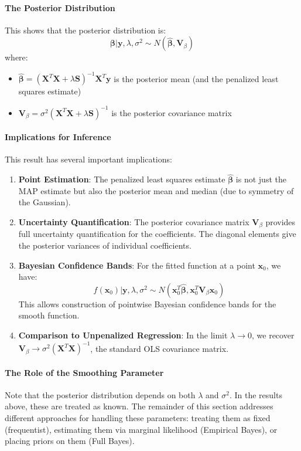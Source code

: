 \documentclass[11pt, a4paper]{article}
\begin{document}
\paragraph{The Posterior Distribution}
This shows that the posterior distribution is:
\[ \boxed{\boldsymbol{\beta} | \mathbf{y}, \lambda, \sigma^2 \sim N(\hat{\boldsymbol{\beta}}, \mathbf{V}_{\beta})} \]
where:
\begin{itemize}
\item $\hat{\boldsymbol{\beta}} = (\mathbf{X}^T\mathbf{X} + \lambda\mathbf{S})^{-1}\mathbf{X}^T\mathbf{y}$ is the posterior mean (and the penalized least squares estimate)
\item $\mathbf{V}_{\beta} = \sigma^2(\mathbf{X}^T\mathbf{X} + \lambda\mathbf{S})^{-1}$ is the posterior covariance matrix
\end{itemize}

\paragraph{Implications for Inference}
This result has several important implications:

\begin{enumerate}
\item \textbf{Point Estimation}: The penalized least squares estimate $\hat{\boldsymbol{\beta}}$ is not just the MAP estimate but also the posterior mean and median (due to symmetry of the Gaussian).

\item \textbf{Uncertainty Quantification}: The posterior covariance matrix $\mathbf{V}_{\beta}$ provides full uncertainty quantification for the coefficients. The diagonal elements give the posterior variances of individual coefficients.

\item \textbf{Bayesian Confidence Bands}: For the fitted function at a point $\mathbf{x}_0$, we have:
\[ f(\mathbf{x}_0) | \mathbf{y}, \lambda, \sigma^2 \sim N(\mathbf{x}_0^T\hat{\boldsymbol{\beta}}, \mathbf{x}_0^T\mathbf{V}_{\beta}\mathbf{x}_0) \]
This allows construction of pointwise Bayesian confidence bands for the smooth function.

\item \textbf{Comparison to Unpenalized Regression}: In the limit $\lambda \to 0$, we recover $\mathbf{V}_{\beta} \to \sigma^2(\mathbf{X}^T\mathbf{X})^{-1}$, the standard OLS covariance matrix.
\end{enumerate}

\paragraph{The Role of the Smoothing Parameter}
Note that the posterior distribution depends on both $\lambda$ and $\sigma^2$. In the results above, these are treated as known. The remainder of this section addresses different approaches for handling these parameters: treating them as fixed (frequentist), estimating them via marginal likelihood (Empirical Bayes), or placing priors on them (Full Bayes).
\end{document}
